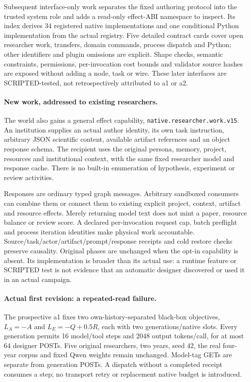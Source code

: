 Subsequent interface-only work separates the fixed authoring protocol into
the trusted system role and adds a read-only effect-ABI namespace to inspect.
Its index derives 34 registered native implementations and one conditional
Python implementation from the actual registry. Five detailed contract cards
cover open researcher work, transfers, domain commands, process dispatch and
Python; other identifiers and plugin omissions are explicit. Shape checks,
semantic constraints, permissions, per-invocation cost bounds and validator
source hashes are exposed without adding a node, task or wire. These later
interfaces are SCRIPTED-tested, not retrospectively attributed to a1 or a2.

\paragraph{New work, addressed to existing researchers.}
The world also gains a general effect capability,
\texttt{native.researcher.work.v15}. An institution supplies an actual author
identity, its own task instruction, arbitrary JSON scientific content,
available artifact references and an object response schema. The recipient
uses the original persona, memory, project, resources and institutional
context, with the same fixed researcher model and response cache. There is
no built-in enumeration of hypothesis, experiment or review activities.

Responses are ordinary typed graph messages. Arbitrary sandboxed consumers
can combine them or connect them to existing explicit project, context,
artifact and resource effects. Merely returning model text does not mint a
paper, resource balance or review score. A declared per-invocation request
cap, batch preflight and process iteration identities make physical work
accountable. Source/task/actor/artifact/prompt/response receipts and cold
restore checks preserve causality. Original phases are unchanged when the
opt-in capability is absent. Its implementation is broader than its actual
use: a runtime feature or SCRIPTED test is not evidence that an automatic
designer discovered or used it in an actual campaign.

\paragraph{Actual first revision: a repeated-read failure.}
The prospective a1 fixes two own-history-separated black-box objectives,
$L_A=-A$ and $L_E=-Q+0.5R$, each with two generations/native slots. Every
generation permits 16 model/tool steps and 2048 output tokens/call, for at
most 64 designer POSTs. Five original researchers, two years, seed 42, the
real four-year corpus and fixed Qwen weights remain unchanged. Model-tag
GETs are separate from generation POSTs. A dispatch without a completed
receipt consumes a step; no transport retry or replacement native budget
is introduced.


